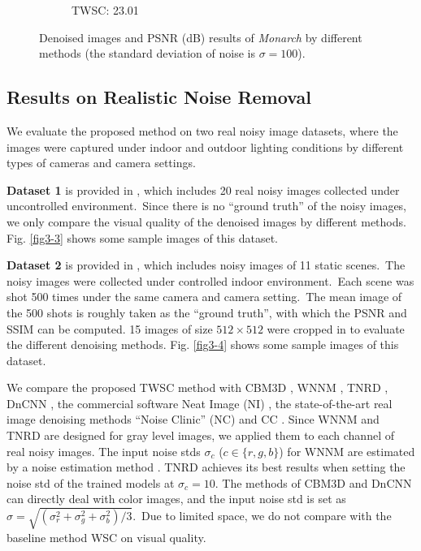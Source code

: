 \begin{figure}
\begin{adjustwidth}{-2cm}{}
\begin{subfigure}[t]{0.19\textwidth}
		\caption{TWSC: 23.01}
    \end{subfigure}
    \caption{Denoised images and PSNR (dB) results of \textsl{Monarch} by different methods (the standard deviation of noise is $\sigma=100$).}
    \label{fig5-6}
\end{adjustwidth}
\end{figure}




\subsection{Results on Realistic Noise Removal}


We evaluate the proposed method on two real noisy image datasets, where the images were captured under indoor and outdoor lighting conditions by different types of cameras and camera settings. 

\textbf{Dataset 1} is provided in \cite{ncwebsite}, which includes 20 real noisy images collected under uncontrolled environment.\ Since there is no ``ground truth'' of the noisy images, we only compare the visual quality of the denoised images by different methods. Fig. \ref{fig3-3} shows some sample images of this dataset.

\textbf{Dataset 2} is provided in \cite{crosschannel2016}, which includes noisy images of 11 static scenes.\ The noisy images were collected under controlled indoor environment.\ Each scene was shot 500 times under the same camera and camera setting.\ The mean image of the 500 shots is roughly taken as the ``ground truth'', with which the PSNR and SSIM \cite{ssim} can be computed. 15 images of size $512\times512$ were cropped in \cite{crosschannel2016} to evaluate the different denoising methods. Fig. \ref{fig3-4} shows some sample images of this dataset.


We compare the proposed TWSC method with CBM3D \cite{cbm3d}, WNNM \cite{wnnm}, TNRD \cite{tnrd}, DnCNN \cite{dncnn}, the commercial software Neat Image (NI) \cite{neatimage}, the state-of-the-art real image denoising methods ``Noise Clinic'' (NC) \cite{noiseclinic} and CC \cite{crosschannel2016}. Since WNNM and TNRD are designed for gray level images, we applied them to each channel of real noisy images. The input noise stds $\sigma_{c}$ ($c\in\{r,g,b\}$) for WNNM are estimated by a noise estimation method \cite{Chen2015ICCV}. TNRD achieves its best results when setting the noise std of the trained models at $\sigma_{c}=10$. The methods of CBM3D and DnCNN can directly deal with color images, and the input noise std is set as $\sigma=\sqrt{(\sigma_{r}^{2}+\sigma_{g}^{2}+\sigma_{b}^{2})/3}$.\ Due to limited space, we do not compare with the baseline method WSC on visual quality.

